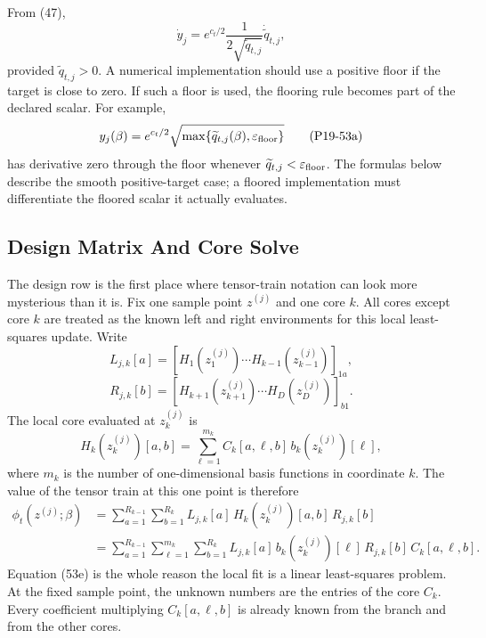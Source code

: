 \documentclass[11pt]{article}
\begin{document}
From (47),
\[
    \dot y_j
    =
    e^{c_t/2}
    \frac{1}{2\sqrt{\widetilde q_{t,j}}}
    \dot{\widetilde q}_{t,j},
    \tag{P19-53}
\]
provided \(\widetilde q_{t,j}>0\).  A numerical implementation should use a
positive floor if the target is close to zero.  If such a floor is used, the
flooring rule becomes part of the declared scalar.  For example,
\[
    y_j(\beta)
    =
    e^{c_t/2}\sqrt{\max\{\widetilde q_{t,j}(\beta),\varepsilon_{\rm floor}\}}
    \tag{P19-53a}
\]
has derivative zero through the floor whenever
\(\widetilde q_{t,j}<\varepsilon_{\rm floor}\).  The formulas below describe
the smooth positive-target case; a floored implementation must differentiate
the floored scalar it actually evaluates.

\subsection{Design Matrix And Core Solve}

The design row is the first place where tensor-train notation can look more
mysterious than it is.  Fix one sample point \(z^{(j)}\) and one core \(k\).
All cores except core \(k\) are treated as the known left and right
environments for this local least-squares update.  Write
\[
    L_{j,k}[a]
    =
    \left[
    H_{1}(z_1^{(j)})\cdots H_{k-1}(z_{k-1}^{(j)})
    \right]_{1a},
    \tag{P19-53b}
\]
\[
    R_{j,k}[b]
    =
    \left[
    H_{k+1}(z_{k+1}^{(j)})\cdots H_D(z_D^{(j)})
    \right]_{b1}.
    \tag{P19-53c}
\]
The local core evaluated at \(z_k^{(j)}\) is
\[
    H_k(z_k^{(j)})[a,b]
    =
    \sum_{\ell=1}^{m_k}
    C_k[a,\ell,b]\,b_k(z_k^{(j)})[\ell],
    \tag{P19-53d}
\]
where \(m_k\) is the number of one-dimensional basis functions in coordinate
\(k\).  The value of the tensor train at this one point is therefore
\[
\begin{aligned}
    \phi_t(z^{(j)};\beta)
    &=
    \sum_{a=1}^{R_{k-1}}
    \sum_{b=1}^{R_k}
    L_{j,k}[a]\,H_k(z_k^{(j)})[a,b]\,R_{j,k}[b]\\
    &=
    \sum_{a=1}^{R_{k-1}}
    \sum_{\ell=1}^{m_k}
    \sum_{b=1}^{R_k}
    L_{j,k}[a]\,
    b_k(z_k^{(j)})[\ell]\,
    R_{j,k}[b]\,
    C_k[a,\ell,b].
\end{aligned}
    \tag{P19-53e}
\]
Equation (53e) is the whole reason the local fit is a linear least-squares
problem.  At the fixed sample point, the unknown numbers are the entries of
the core \(C_k\).  Every coefficient multiplying \(C_k[a,\ell,b]\) is already
known from the branch and from the other cores.
\end{document}
